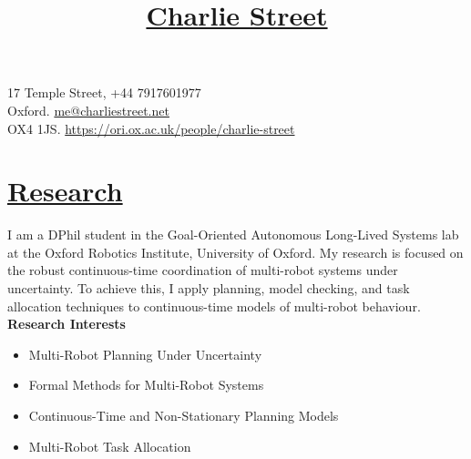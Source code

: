 \documentclass[11pt]{article}
\title{\vspace{-70pt}\Huge\underline{Charlie Street}}
\date{}
\begin{document}
\maketitle
\vspace*{-60pt}

\begin{flushleft}
\noindent
\large 17 Temple Street,
\hfill 
\large +44 7917601977 \\
\large Oxford. 
\hfill
\large
\large \href{mailto:me@charliestreet.net}{\url{me@charliestreet.net}} \\
\large OX4 1JS.
\hfill
\large
\url{https://ori.ox.ac.uk/people/charlie-street} \\
\end{flushleft}
	
\section*{\uline{Research}}	
        
I am a DPhil student in the Goal-Oriented Autonomous Long-Lived Systems lab at the Oxford Robotics Institute, University of Oxford.
%
My research is focused on the robust continuous-time coordination of multi-robot systems under uncertainty.
%
To achieve this, I apply planning, model checking, and task allocation techniques to continuous-time models of multi-robot behaviour.\\

\noindent \textbf{Research Interests}
\begin{itemize}
    \item Multi-Robot Planning Under Uncertainty
    \item Formal Methods for Multi-Robot Systems
    \item Continuous-Time and Non-Stationary Planning Models
    \item Multi-Robot Task Allocation
\end{itemize}
	
\end{document}
